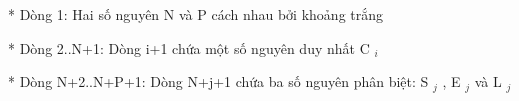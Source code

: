 * Dòng 1: Hai số nguyên N và P cách nhau bởi khoảng trắng  

   * Dòng 2..N+1: Dòng i+1 chứa một số nguyên duy nhất C   $_    i   $

   * Dòng N+2..N+P+1: Dòng N+j+1 chứa ba số nguyên phân biệt: S   $_    j   $   , E   $_    j   $   và L   $_    j   $

\